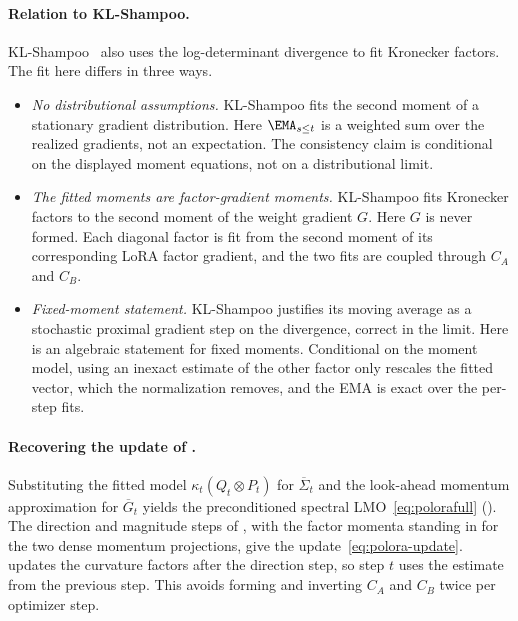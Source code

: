 \paragraph{Relation to KL-Shampoo.}
KL-Shampoo~\cite{klshampoo} also uses the log-determinant divergence to
fit Kronecker factors. The fit here differs in three ways.
\begin{itemize}[leftmargin=1.5em,itemsep=1pt,topsep=2pt]
  \item \emph{No distributional assumptions.} KL-Shampoo fits the second
  moment of a stationary gradient distribution. Here $\EMA_{s\le t}$ is a
  weighted sum over the realized gradients, not an expectation. The
  consistency claim is conditional on the displayed moment equations, not
  on a distributional limit.
  \item \emph{The fitted moments are factor-gradient moments.} KL-Shampoo
  fits Kronecker factors to the second moment of the weight gradient $G$.
  Here $G$ is never formed. Each diagonal factor is fit from the second
  moment of its corresponding LoRA factor gradient, and the two fits are
  coupled through $C_A$ and $C_B$.
  \item \emph{Fixed-moment statement.} KL-Shampoo
  justifies its moving average as a stochastic proximal gradient step on the
  divergence, correct in the limit. Here  is an
  algebraic statement for fixed moments. Conditional on the moment model,
  using an inexact estimate of the other factor only rescales the fitted
  vector, which the normalization removes, and the EMA is exact over the
  per-step fits.
\end{itemize}

\paragraph{Recovering the update of .}
Substituting the fitted model $\kappa_t(Q_t\otimes P_t)$ for
$\overline\Sigma_t$ and the look-ahead momentum approximation for
$\overline G_t$ yields the preconditioned spectral
LMO~\eqref{eq:polorafull} (). The
direction and magnitude steps of , with the
factor momenta standing in for the two dense momentum projections, give
the update~\eqref{eq:polora-update}.  updates the
curvature factors after the direction step, so step $t$ uses the estimate
from the previous step. This avoids forming and inverting $C_A$ and
$C_B$ twice per optimizer step.

